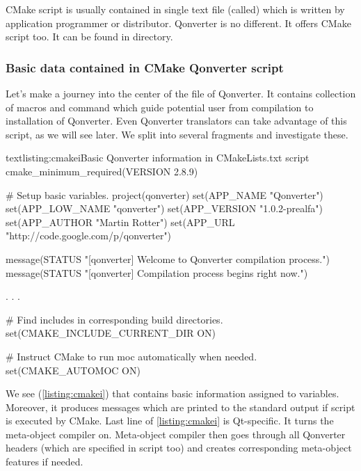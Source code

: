 CMake script is usually contained in single text file (called) which is written by application programmer or distributor. Qonverter is no different. It offers CMake script too. It can be found in directory. 

\subsubsection{Basic data contained in CMake Qonverter script}
Let's make a journey into the center of the file of Qonverter. It contains collection of macros and command which guide potential user from compilation to installation of Qonverter. Even Qonverter translators can take advantage of this script, as we will see later. We split into several fragments and investigate these.

\begin{fdoccode}{text}{listing:cmakei}{Basic Qonverter information in CMakeLists.txt script}
cmake_minimum_required(VERSION 2.8.9)

# Setup basic variables.
project(qonverter)
set(APP_NAME "Qonverter")
set(APP_LOW_NAME "qonverter")
set(APP_VERSION "1.0.2-prealfa")
set(APP_AUTHOR "Martin Rotter")
set(APP_URL "http://code.google.com/p/qonverter")

message(STATUS "[qonverter] Welcome to Qonverter compilation process.")
message(STATUS "[qonverter] Compilation process begins right now.")

.
.
.

# Find includes in corresponding build directories.
set(CMAKE_INCLUDE_CURRENT_DIR ON)

# Instruct CMake to run moc automatically when needed.
set(CMAKE_AUTOMOC ON)
\end{fdoccode}

We see (\autoref{listing:cmakei}) that contains basic information assigned to variables. Moreover, it produces messages which are printed to the standard output if script is executed by CMake. Last line of \autoref{listing:cmakei} is Qt-specific. It turns the meta-object compiler on. Meta-object compiler then goes through all Qonverter headers (which are specified in script too) and creates corresponding meta-object features if needed.


